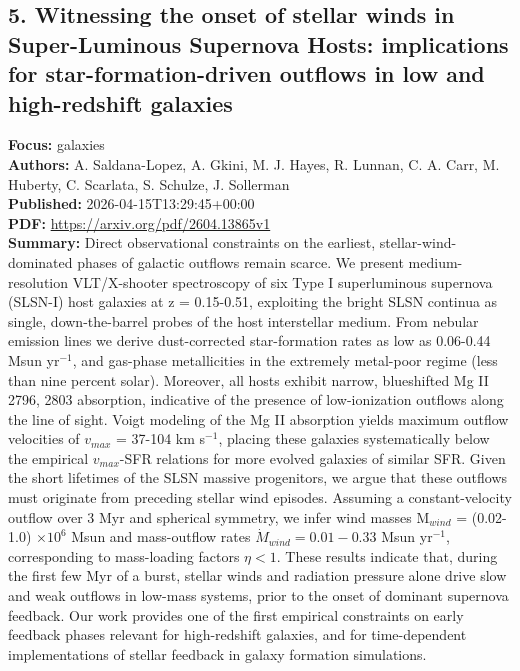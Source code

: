 \documentclass[11pt]{article}
\begin{document}
\subsection*{5. Witnessing the onset of stellar winds in Super-Luminous Supernova Hosts: implications for star-formation-driven outflows in low and high-redshift galaxies}
\textbf{Focus:} galaxies\\
\textbf{Authors:} A. Saldana-Lopez, A. Gkini, M. J. Hayes, R. Lunnan, C. A. Carr, M. Huberty, C. Scarlata, S. Schulze, J. Sollerman\\
\textbf{Published:} 2026-04-15T13:29:45+00:00\\
\textbf{PDF:} \href{https://arxiv.org/pdf/2604.13865v1}{https://arxiv.org/pdf/2604.13865v1}\\
\textbf{Summary:}
Direct observational constraints on the earliest, stellar-wind-dominated phases of galactic outflows remain scarce. We present medium-resolution VLT/X-shooter spectroscopy of six Type I superluminous supernova (SLSN-I) host galaxies at z = 0.15-0.51, exploiting the bright SLSN continua as single, down-the-barrel probes of the host interstellar medium. From nebular emission lines we derive dust-corrected star-formation rates as low as 0.06-0.44 Msun yr$^{-1}$, and gas-phase metallicities in the extremely metal-poor regime (less than nine percent solar). Moreover, all hosts exhibit narrow, blueshifted Mg II 2796, 2803 absorption, indicative of the presence of low-ionization outflows along the line of sight. Voigt modeling of the Mg II absorption yields maximum outflow velocities of $v_{max}$ = 37-104 km s$^{-1}$, placing these galaxies systematically below the empirical $v_{max}$-SFR relations for more evolved galaxies of similar SFR. Given the short lifetimes of the SLSN massive progenitors, we argue that these outflows must originate from preceding stellar wind episodes. Assuming a constant-velocity outflow over 3 Myr and spherical symmetry, we infer wind masses M$_{wind}$ = (0.02-1.0) $\times 10^6$ Msun and mass-outflow rates $\dot{M}_{wind} = 0.01-0.33$ Msun yr$^{-1}$, corresponding to mass-loading factors $η<1$. These results indicate that, during the first few Myr of a burst, stellar winds and radiation pressure alone drive slow and weak outflows in low-mass systems, prior to the onset of dominant supernova feedback. Our work provides one of the first empirical constraints on early feedback phases relevant for high-redshift galaxies, and for time-dependent implementations of stellar feedback in galaxy formation simulations.
\newpage
\end{document}
